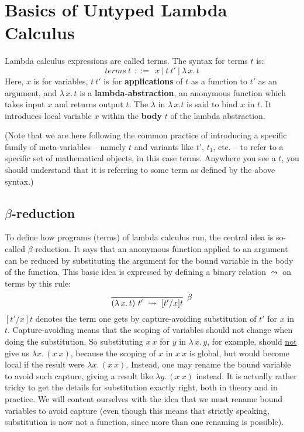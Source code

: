 \documentclass{article}
\begin{document}
\section{Basics of Untyped Lambda Calculus}

Lambda calculus expressions are called terms.  The syntax for terms $t$
is:
\[
\textit{terms}\ t\ \  ::=\ \  x\ |\ t\ t'\ |\ \lambda\,x.\, t
\]
\noindent Here, $x$ is for variables, $t\ t'$ is for
\textbf{applications} of $t$ as a function to $t'$ as an argument, and
$\lambda\,x.\, t$ is a \textbf{lambda-abstraction}, an anonymous
function which takes input $x$ and returns output $t$.  The $\lambda$
in $\lambda\,x.t$ is said to bind $x$ in $t$.  It introduces local
variable $x$ within the \textbf{body} $t$ of the lambda abstraction.

(Note that we are here following the common practice of introducing a
specific family of meta-variables -- namely $t$ and variants like
$t'$, $t_1$, etc. -- to refer to a specific set of mathematical
objects, in this case terms.  Anywhere you see a $t$, you should
understand that it is referring to some term as defined by the above
syntax.)

\subsection{\texorpdfstring{$\beta$}{β}-reduction}

To define how programs (terms) of lambda calculus run, the central
idea is so-called $\beta$-reduction.  It says that an anonymous
function applied to an argument can be reduced by substituting the
argument for the bound variable in the body of the function.  This
basic idea is expressed by defining a binary relation $\leadsto$ on
terms by this rule:
\[
\infer[\beta]{(\lambda\,x.\, t)\ t'\ \leadsto\ [t'/x]t}
                                {\ }
\]
\noindent $[t'/x]t$ denotes the term one gets by capture-avoiding substitution
of $t'$ for $x$ in $t$.  Capture-avoiding means that the scoping of variables
should not change when doing the substitution.  So substituting $x\ x$ for $y$
in $\lambda\,x.\, y$, for example, should \underline{not} give us $\lambda x.\, (x\ x)$,
because the scoping of $x$ in $x\ x$ is global, but would become local
if the result were $\lambda x.\, (x\ x)$.  Instead, one may rename the bound variable
to avoid such capture, giving a result like $\lambda y.\, (x\ x)$ instead.  It
is actually rather tricky to get the details for substitution exactly right,
both in theory and in practice.  We will content ourselves with the idea
that we must rename bound variables to avoid capture (even though this means
that strictly speaking, substitution is now not a function, since more than
one renaming is possible).
\end{document}

